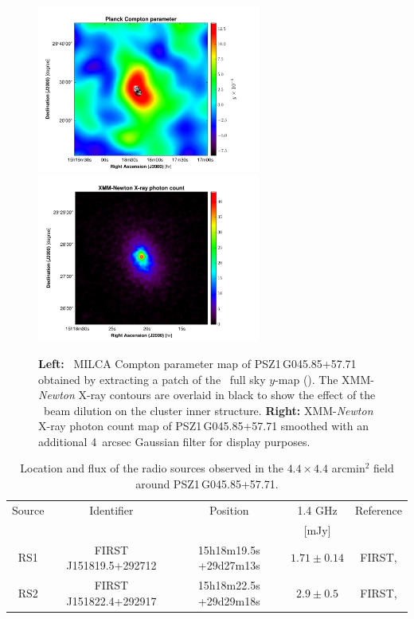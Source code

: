 \documentclass[traditabstract]{aa}
\begin{document}
\begin{figure}[t]
\centering
\includegraphics[height=5.5cm]{Compton_map.pdf}
\hspace{0.5cm}
\includegraphics[height=5.5cm]{Xray_map.pdf}
\caption{{\footnotesize \textbf{Left:} \planck\ MILCA Compton parameter map of \mbox{PSZ1\,G045.85+57.71} obtained by extracting a patch of the \planck\ full sky $y$-map (\citealt{ymap_planck}). The XMM-{\it Newton} X-ray contours are overlaid in black to show the effect of the \planck\ beam dilution on the cluster inner structure. \textbf{Right:} XMM-{\it Newton} X-ray photon count map of \mbox{PSZ1\,G045.85+57.71} smoothed with an additional 4~arcsec Gaussian filter for display purposes.}}
\label{fig:Planck_XMM}
\end{figure}
\begin{table}[h]
\begin{center}
\begin{tabular}{ccccc}
\hline
\hline
Source & Identifier & Position & 1.4 GHz & Reference\\
 &  &  & [mJy] & \\
\hline
RS1 & FIRST J151819.5+292712 & 15h18m19.5s +29d27m13s  & $1.71 \pm 0.14$ & FIRST, \citealt{Becker1995} \\
RS2 & FIRST J151822.4+292917 & 15h18m22.5s +29d29m18s  & $2.9 \pm 0.5$  &  FIRST, \citealt{Becker1995} \\  
\hline
\hline
\end{tabular}
\end{center}
\caption{{\footnotesize Location and flux of the radio sources observed in the $4.4 \times 4.4$ arcmin$^2$ field around \mbox{PSZ1\,G045.85+57.71}.}}
\label{tab:Radio_ps}
\end{table}
\end{document}
